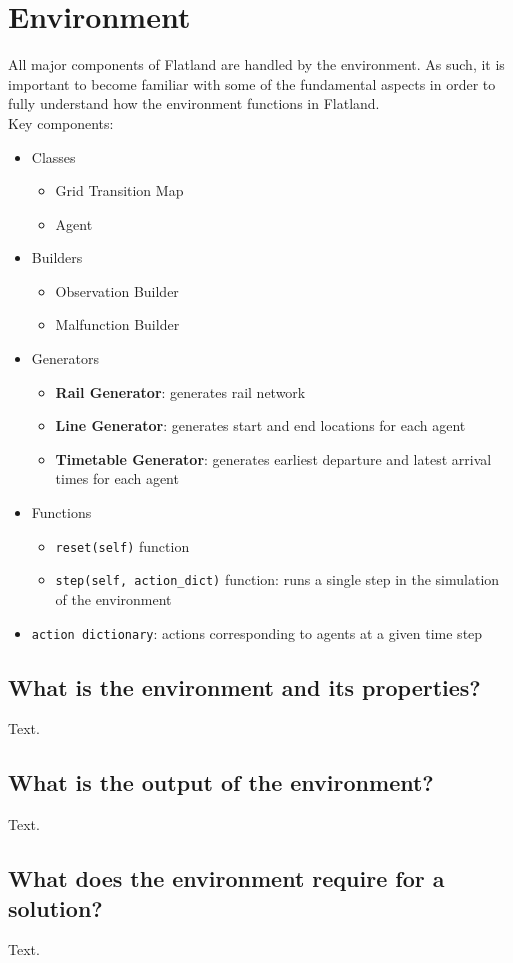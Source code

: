 \section{Environment}\label{sec:environment}
All major components of Flatland are handled by the environment.  As such, it is important to become familiar with some of the fundamental aspects in order to fully understand how the environment functions in Flatland. \\

\noindent Key components:

\begin{itemize}
	\item Classes
	\begin{itemize}
		\item Grid Transition Map
		\item Agent
	\end{itemize}
	\item Builders
	\begin{itemize}
		\item Observation Builder
		\item Malfunction Builder
	\end{itemize}
	\item Generators
	\begin{itemize}
		\item \textbf{Rail Generator}: generates rail network
		\item \textbf{Line Generator}: generates start and end locations for each agent
		\item \textbf{Timetable Generator}: generates earliest departure and latest arrival times for each agent
	\end{itemize}
	\item Functions
	\begin{itemize}
		\item \texttt{reset(self)} function
		\item \texttt{step(self, action\_dict)} function: runs a single step in the simulation of the environment
	\end{itemize}
	\item \texttt{action dictionary}: actions corresponding to agents at a given time step
\end{itemize}

\subsection{What is the environment and its properties?}
Text.

\subsection{What is the output of the environment?}
Text.

\subsection{What does the environment require for a solution?}
Text.
